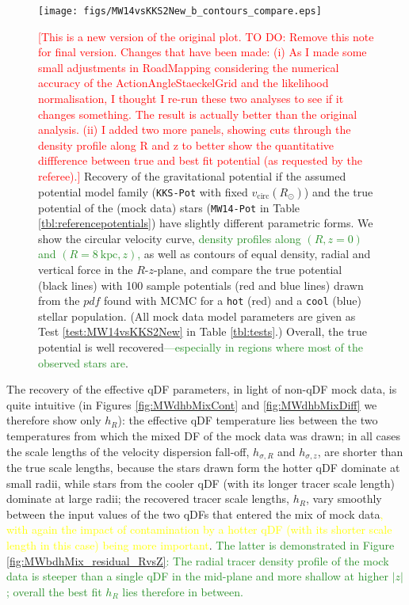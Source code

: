 \documentclass[iop,revtex4,numberedappendix,appendixfloats]{emulateapj}
\newcommand{\pdf}{\ensuremath{pdf}}
\newcommand{\NEW}[1]{\textcolor{ForestGreen}{#1}}
\newcommand{\OLD}[1]{\textcolor{Yellow}{#1}}%
\newcommand{\NOTE}[1]{\textcolor{Red}{#1}}
\begin{document}
\begin{figure}[!htbp]
\centering
\texttt{[image: figs/MW14vsKKS2New\_b\_contours\_compare.eps]}
\caption{\NOTE{[This is a new version of the original plot. TO DO: Remove this note for final version. Changes that have been made: (i) As I made some small adjustments in RoadMapping considering the numerical accuracy of the ActionAngleStaeckelGrid and the likelihood normalisation, I thought I re-run these two analyses to see if it changes something. The result is actually better than the original analysis. (ii) I added two more panels, showing cuts through the density profile along R and z to better show the quantitative diffference between true and best fit potential (as requested by the referee).]} Recovery of the gravitational potential if the assumed potential model family (\texttt{KKS-Pot} with fixed $v_\text{circ}(R_\odot)$) and the true potential of the (mock data) stars (\texttt{MW14-Pot} in Table \ref{tbl:referencepotentials}) have slightly different parametric forms. We show the circular velocity curve, \NEW{density profiles along $(R,z=0)$ and $(R=8~\text{kpc},z)$,} as well as contours of equal density, radial and vertical force in the $R$-$z$-plane, and compare the true potential (black lines) with 100 sample potentials (red and blue lines) drawn from the \pdf{} found with MCMC for a \texttt{hot} (red) and a \texttt{cool} (blue) stellar population. (All mock data model parameters are given as Test \ref{test:MW14vsKKS2New} in Table \ref{tbl:tests}.) Overall, the true potential is well recovered\NEW{---especially in regions where most of the observed stars are}.}
\label{fig:MW14vsKKS2New_contours}
\end{figure}

The recovery of the effective qDF parameters, in light of non-qDF mock data, is quite intuitive (in Figures \ref{fig:MWdhbMixCont} and \ref{fig:MWdhbMixDiff} we therefore show only $h_R$): the effective qDF temperature lies between the two temperatures from which the mixed DF of the mock data was drawn; in all cases the scale lengths of the velocity dispersion fall-off, $h_{\sigma,R}$ and $h_{\sigma,z}$, are shorter than the true scale lengths, because the stars drawn form the hotter qDF dominate at small radii, while stars from the cooler qDF (with its longer tracer scale length) dominate at large radii; the recovered tracer scale lengths, $h_R$, vary smoothly between the input values of the two qDFs that entered the mix of mock data\OLD{, with again the impact of contamination by a hotter qDF (with its shorter scale length in this case) being more important}. \NEW{The latter is demonstrated in Figure \ref{fig:MWbdhMix_residual_RvsZ}: The radial tracer density profile of the mock data is steeper than a single qDF in the mid-plane and more shallow at higher $|z|$; overall the best fit $h_R$ lies therefore in between.}
\end{document}
